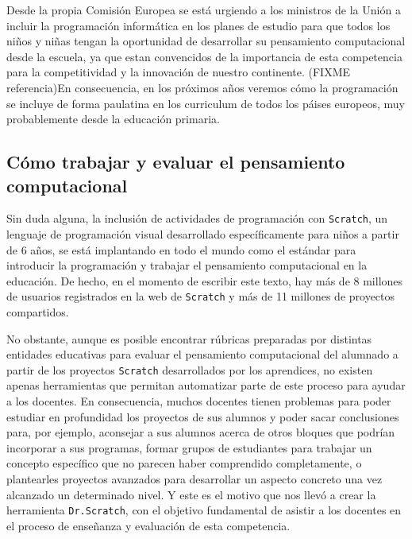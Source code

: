 \documentclass[a4paper,10pt]{article}
\begin{document}
Desde la propia Comisión Europea se está urgiendo a los ministros de la Unión a incluir la programación informática en los planes de estudio para que todos los niños y niñas tengan la oportunidad de desarrollar su pensamiento computacional desde la escuela, ya que estan convencidos de la importancia de esta competencia para la competitividad y la innovación de nuestro continente. (FIXME referencia)En consecuencia, en los próximos años veremos cómo la programación se incluye de forma paulatina en los curriculum de todos los páises europeos, muy probablemente desde la educación primaria.

\subsection*{Cómo trabajar y evaluar el pensamiento computacional}
Sin duda alguna, la inclusión de actividades de programación con \texttt{Scratch}, un lenguaje de programación visual desarrollado específicamente para niños a partir de 6 años, se está implantando en todo el mundo como el estándar para introducir la programación y trabajar el pensamiento computacional en la educación. De hecho, en el momento de escribir este texto, hay más de 8 millones de usuarios registrados en la web de \texttt{Scratch} y más de 11 millones de proyectos compartidos.

No obstante, aunque es posible encontrar rúbricas preparadas por distintas entidades educativas para evaluar el pensamiento computacional del alumnado a partir de los proyectos \texttt{Scratch} desarrollados por los aprendices, no existen apenas herramientas que permitan automatizar parte de este proceso para ayudar a los docentes. En consecuencia, muchos docentes tienen problemas para poder estudiar en profundidad los proyectos de sus alumnos y poder sacar conclusiones para, por ejemplo, aconsejar a sus alumnos acerca de otros bloques que podrían incorporar a sus programas, formar grupos de estudiantes para trabajar un concepto específico que no parecen haber comprendido completamente, o plantearles proyectos avanzados para desarrollar un aspecto concreto una vez alcanzado un determinado nivel. Y este es el motivo que nos llevó a crear la herramienta \texttt{Dr.Scratch}, con el objetivo fundamental de asistir a los docentes en el proceso de enseñanza y evaluación de esta competencia.
\end{document}
